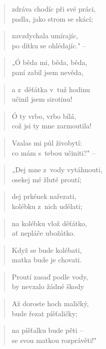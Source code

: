 \begin{verse}
zdráva chodíc při své práci, \\
padla, jako strom se skácí;
\end{verse}

\begin{verse}
zavzdychala umírajíc, \\
po dítku se ohlédajíc." --
\end{verse}

\begin{verse}
„Ó běda mi, běda, běda, \\
paní zabil jsem nevěda,
\end{verse}

\begin{verse}
a z~děťátka v~tuž hodinu \\
učinil jsem sirotinu!
\end{verse}

\begin{verse}
Ó ty vrbo, vrbo bílá, \\
což jsi ty mne zarmoutila!
\end{verse}

\begin{verse}
Vzalas mi půl živobytí: \\
co mám s~tebou učiniti?" --
\end{verse}

\begin{verse}
„Dej mne z~vody vytáhnouti, \\
osekej mé žluté proutí;
\end{verse}

\begin{verse}
dej prkének nařezati, \\
kolébku z~nich udělati;
\end{verse}

\begin{verse}
na kolébku vlož děťátko, \\
ať nepláče ubožátko.
\end{verse}

\begin{verse}
Když se bude kolébati, \\
matka bude je chovati.
\end{verse}

\begin{verse}
Proutí zasaď podle vody, \\
by nevzalo žádné škody
\end{verse}

\begin{verse}
Až doroste hoch maličký, \\
bude řezat píšťaličky;
\end{verse}

\begin{verse}
na píšťalku bude pěti -- \\
se svou matkou rozprávěti!"
\end{verse}